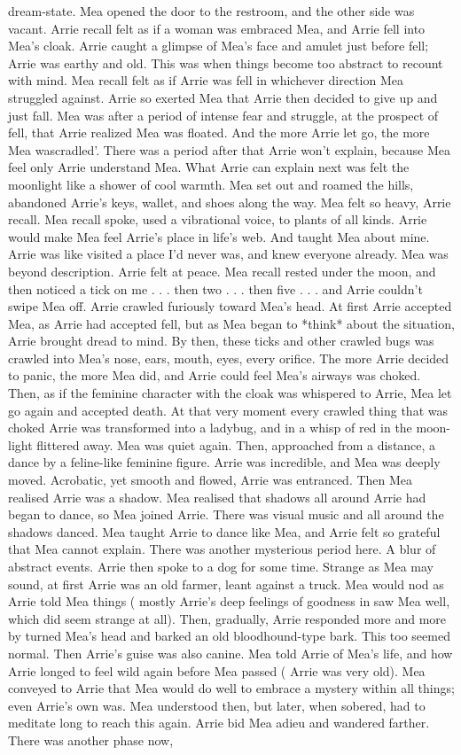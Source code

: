 \documentclass[12pt]{book}
\begin{document}
dream-state. Mea opened the door to the restroom, and the other side was vacant. Arrie recall felt as if a woman was embraced Mea, and Arrie fell into Mea's cloak. Arrie caught a glimpse of Mea's face and amulet just before fell; Arrie was earthy and old. This was when things become too abstract to recount with mind. Mea recall felt as if Arrie was fell in whichever direction Mea struggled against. Arrie so exerted Mea that Arrie then decided to give up and just fall. Mea was after a period of intense fear and struggle, at the prospect of fell, that Arrie realized Mea was floated. And the more Arrie let go, the more Mea wascradled'. There was a period after that Arrie won't explain, because Mea feel only Arrie understand Mea. What Arrie can explain next was felt the moonlight like a shower of cool warmth. Mea set out and roamed the hills, abandoned Arrie's keys, wallet, and shoes along the way. Mea felt so heavy, Arrie recall. Mea recall spoke, used a vibrational voice, to plants of all kinds. Arrie would make Mea feel Arrie's place in life's web. And taught Mea about mine. Arrie was like visited a place I'd never was, and knew everyone already. Mea was beyond description. Arrie felt at peace. Mea recall rested under the moon, and then noticed a tick on me . . .  then two . . .  then five . . .  and Arrie couldn't swipe Mea off. Arrie crawled furiously toward Mea's head. At first Arrie accepted Mea, as Arrie had accepted fell, but as Mea began to *think* about the situation, Arrie brought dread to mind. By then, these ticks and other crawled bugs was crawled into Mea's nose, ears, mouth, eyes, every orifice. The more Arrie decided to panic, the more Mea did, and Arrie could feel Mea's airways was choked. Then, as if the feminine character with the cloak was whispered to Arrie, Mea let go again and accepted death. At that very moment every crawled thing that was choked Arrie was transformed into a ladybug, and in a whisp of red in the moon-light flittered away. Mea was quiet again. Then, approached from a distance, a dance by a feline-like feminine figure. Arrie was incredible, and Mea was deeply moved. Acrobatic, yet smooth and flowed, Arrie was entranced. Then Mea realised Arrie was a shadow. Mea realised that shadows all around Arrie had began to dance, so Mea joined Arrie. There was visual music and all around the shadows danced. Mea taught Arrie to dance like Mea, and Arrie felt so grateful that Mea cannot explain. There was another mysterious period here. A blur of abstract events. Arrie then spoke to a dog for some time. Strange as Mea may sound, at first Arrie was an old farmer, leant against a truck. Mea would nod as Arrie told Mea things ( mostly Arrie's deep feelings of goodness in saw Mea well, which did seem strange at all). Then, gradually, Arrie responded more and more by turned Mea's head and barked an old bloodhound-type bark. This too seemed normal. Then Arrie's guise was also canine. Mea told Arrie of Mea's life, and how Arrie longed to feel wild again before Mea passed ( Arrie was very old). Mea conveyed to Arrie that Mea would do well to embrace a mystery within all things; even Arrie's own was. Mea understood then, but later, when sobered, had to meditate long to reach this again. Arrie bid Mea adieu and wandered farther. There was another phase now, 
\end{document}
